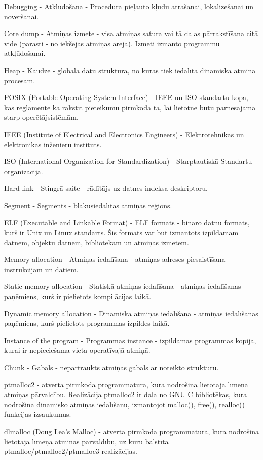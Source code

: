 \noindent 

Debugging - Atkļūdošana - Procedūra pieļauto kļūdu atrašanai, lokalizēšanai un novēršanai.

Core dump - Atmiņas izmete - visa atmiņas satura vai tā daļas pārrakstīšana citā vidē (parasti - no iekšējās atmiņas ārējā). 
Izmeti izmanto programmu atkļūdošanai.

Heap - Kaudze - globāla datu struktūra,  no kuras tiek iedalīta dinamiskā atmiņa procesam.

POSIX (Portable Operating System Interface) - IEEE un ISO standartu kopa,  kas reglamentē kā rakstīt pieteikumu pirmkodā tā, lai lietotne būtu pārnēsājama starp operētājsistēmām.

IEEE (Institute of Electrical and Electronics Engineers) - Elektrotehnikas un elektronikas inženieru institūts.

ISO (International Organization for Standardization) - Starptautiskā Standartu organizācija.

Hard link - Stingrā saite - rādītājs uz datnes indeksa deskriptoru. 

Segment - Segments - blakusiedalītas atmiņas reģions.

ELF (Executable and Linkable Format) - ELF formāts -  bināro datņu formāts, kurš ir Unix un Linux standarts. Šis formāts var būt izmantots izpildāmām datnēm, objektu datnēm, bibliotēkām un atmiņas izmetēm.

Memory allocation - Atmiņas iedalīšana - atmiņas adreses piesaistīšana instrukcijām un datiem.

Static memory allocation - Statiskā atmiņas iedalīšana -  atmiņas iedalīšanas paņēmiens, kurš ir pielietots kompilācijas laikā.

Dynamic memory allocation - Dinamiskā atmiņas iedalīšana - atmiņas iedalīšanas paņēmiens, kurš pielietots programmas izpildes laikā. 

Instance of the program - Programmas instance - izpildāmās programmas kopija, kurai ir nepieciešama vieta operatīvajā atmiņā.

Chunk - Gabals - nepārtraukts atmiņas gabals ar noteikto struktūru.

ptmalloc2 - atvērtā pirmkoda programmatūra, kura nodrošina lietotāja līmeņa atmiņas pārvaldību. Realizācija ptmalloc2 ir daļa no GNU C bibliotēkas, kura nodrošina dinamisko atmiņas iedalīšanu, izmantojot malloc(), free(), realloc() funkcijas izsaukumus.

dlmalloc (Doug Lea's Malloc) - atvērtā pirmkoda programmatūra, kura nodrošina lietotāja līmeņa atmiņas pārvaldību, uz kuru balstīta ptmalloc/ptmalloc2/ptmalloc3 realizācijas.


